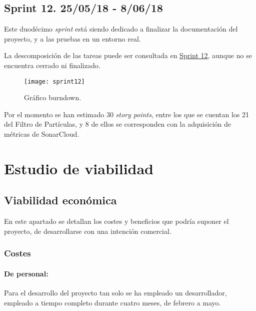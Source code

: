 \subsection{Sprint 12. 25/05/18 - 8/06/18}

Este duodécimo \emph{sprint} está siendo dedicado a finalizar la documentación del proyecto, y a las pruebas en un entorno real. 

La descomposición de las tareas puede ser consultada en \href{https://github.com/mbm0089/gii_0_17.02_snsi/milestone/11}{Sprint 12}, aunque no se encuentra cerrado ni finalizado.

\begin{figure}[H]
	\centering
	\texttt{[image: sprint12]}
	\caption[Burndown Sprint 12]{Gráfico burndown.}\label{fig:sprint12}
\end{figure}

Por el momento se han estimado 30 \emph{story points}, entre los que se cuentan los 21 del Filtro de Partículas, y 8 de ellos se corresponden con la adquisición de métricas de SonarCloud.  



\section{Estudio de viabilidad}

\subsection{Viabilidad económica}

En este apartado se detallan los costes y beneficios que podría suponer el proyecto, de desarrollarse con una intención comercial. 

\subsubsection{Costes}

\paragraph{De personal:}

Para el desarrollo del proyecto tan solo se ha empleado un desarrollador, empleado a tiempo completo durante cuatro meses, de febrero a mayo.

